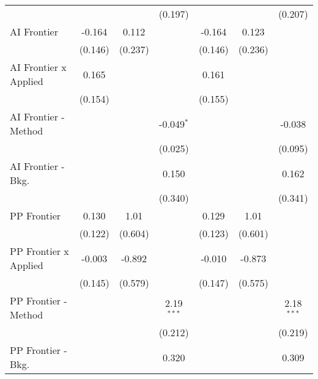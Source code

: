\begin{tabular}{lcccccc}
                                  &                &              & (0.197)       &                &              & (0.207)\\   
   AI Frontier                    & -0.164         & 0.112        &               & -0.164         & 0.123        &   \\   
                                  & (0.146)        & (0.237)      &               & (0.146)        & (0.236)      &   \\   
   AI Frontier x Applied          & 0.165          &              &               & 0.161          &              &   \\   
                                  & (0.154)        &              &               & (0.155)        &              &   \\   
   AI Frontier - Method           &                &              & -0.049$^{*}$  &                &              & -0.038\\   
                                  &                &              & (0.025)       &                &              & (0.095)\\   
   AI Frontier - Bkg.             &                &              & 0.150         &                &              & 0.162\\   
                                  &                &              & (0.340)       &                &              & (0.341)\\   
   PP Frontier                    & 0.130          & 1.01         &               & 0.129          & 1.01         &   \\   
                                  & (0.122)        & (0.604)      &               & (0.123)        & (0.601)      &   \\   
   PP Frontier x Applied          & -0.003         & -0.892       &               & -0.010         & -0.873       &   \\   
                                  & (0.145)        & (0.579)      &               & (0.147)        & (0.575)      &   \\   
   PP Frontier - Method           &                &              & 2.19$^{***}$  &                &              & 2.18$^{***}$\\   
                                  &                &              & (0.212)       &                &              & (0.219)\\   
   PP Frontier - Bkg.             &                &              & 0.320         &                &              & 0.309\\   

\end{tabular}
